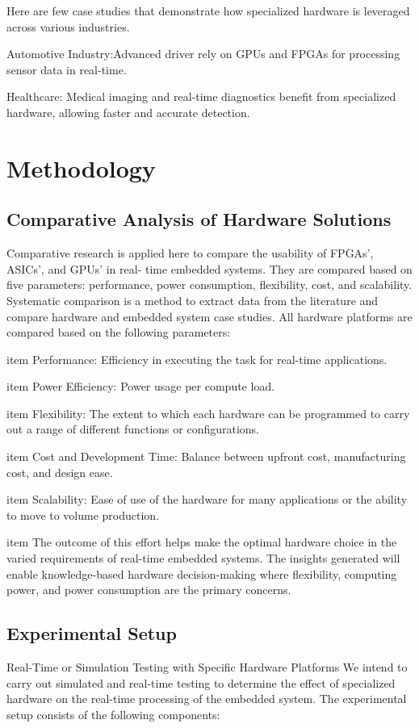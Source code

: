 \documentclass{article}
\begin{document}
Here are few case studies that demonstrate how specialized hardware is leveraged across
various industries.

Automotive Industry:Advanced driver rely on GPUs and FPGAs for processing sensor data in real-time.

Healthcare: Medical imaging and real-time diagnostics benefit from specialized hardware, allowing faster and accurate detection.

\newpage
\section{Methodology}
\subsection{Comparative Analysis of Hardware Solutions}
Comparative research is applied here to compare the usability of FPGAs’, ASICs’, and GPUs’ in real-
time embedded systems. They are compared based on five parameters: performance, power consumption,
flexibility, cost, and scalability. Systematic comparison is a method to extract data from the literature
and compare hardware and embedded system case studies. All hardware platforms are compared based
on the following parameters: 

item Performance: Efficiency in executing the task for real-time applications.

item Power Efficiency: Power usage per compute load. 

item Flexibility: The extent to which each hardware can
	be programmed to carry out a range of different functions or configurations. 
    
item Cost and  Development Time: Balance between upfront cost, manufacturing cost, and design ease. 
    
item Scalability: Ease of use of the hardware for many applications or the ability to move to volume production.


item The outcome of this effort helps make the optimal hardware choice in the varied requirements of real-time embedded systems. The insights generated will enable knowledge-based hardware decision-making where flexibility, computing power, and power consumption are the primary concerns.


\subsection{Experimental Setup}
Real-Time or Simulation Testing with Specific Hardware Platforms
We intend to carry out simulated and real-time testing to determine the effect of
specialized hardware on the real-time processing of the embedded system. The experimental setup consists of the following components:
\end{document}
